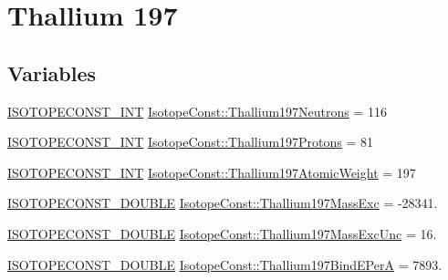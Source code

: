 \hypertarget{group___isotope_const-_thallium-_tl197}{}\section{Thallium 197}
\label{group___isotope_const-_thallium-_tl197}
\subsection*{Variables}
\begin{DoxyCompactItemize}
\item 
\mbox{\hyperlink{group___isotope_const-_macros_ga5f18360b3e99483a35c32d789e62621c}{I\+S\+O\+T\+O\+P\+E\+C\+O\+N\+S\+T\+\_\+\+I\+NT}} \mbox{\hyperlink{group___isotope_const-_thallium-_tl197_ga1d223f5d027e66e6d9dc82ab54781329}{Isotope\+Const\+::\+Thallium197\+Neutrons}} = 116
\item 
\mbox{\hyperlink{group___isotope_const-_macros_ga5f18360b3e99483a35c32d789e62621c}{I\+S\+O\+T\+O\+P\+E\+C\+O\+N\+S\+T\+\_\+\+I\+NT}} \mbox{\hyperlink{group___isotope_const-_thallium-_tl197_gacc697cdf6e3c2a5d7f49e83fddb185a8}{Isotope\+Const\+::\+Thallium197\+Protons}} = 81
\item 
\mbox{\hyperlink{group___isotope_const-_macros_ga5f18360b3e99483a35c32d789e62621c}{I\+S\+O\+T\+O\+P\+E\+C\+O\+N\+S\+T\+\_\+\+I\+NT}} \mbox{\hyperlink{group___isotope_const-_thallium-_tl197_ga939c7b7c75b3d274691f4d997e8701d2}{Isotope\+Const\+::\+Thallium197\+Atomic\+Weight}} = 197
\item 
\mbox{\hyperlink{group___isotope_const-_macros_ga8f45a7272ce02c0b4c65c44636ed719a}{I\+S\+O\+T\+O\+P\+E\+C\+O\+N\+S\+T\+\_\+\+D\+O\+U\+B\+LE}} \mbox{\hyperlink{group___isotope_const-_thallium-_tl197_ga4ce213221b7a7850da5516ad109455b4}{Isotope\+Const\+::\+Thallium197\+Mass\+Exc}} = -\/28341.
\item 
\mbox{\hyperlink{group___isotope_const-_macros_ga8f45a7272ce02c0b4c65c44636ed719a}{I\+S\+O\+T\+O\+P\+E\+C\+O\+N\+S\+T\+\_\+\+D\+O\+U\+B\+LE}} \mbox{\hyperlink{group___isotope_const-_thallium-_tl197_gae0f626bf8d59512c9069a0d0c94f8102}{Isotope\+Const\+::\+Thallium197\+Mass\+Exc\+Unc}} = 16.
\item 
\mbox{\hyperlink{group___isotope_const-_macros_ga8f45a7272ce02c0b4c65c44636ed719a}{I\+S\+O\+T\+O\+P\+E\+C\+O\+N\+S\+T\+\_\+\+D\+O\+U\+B\+LE}} \mbox{\hyperlink{group___isotope_const-_thallium-_tl197_ga09b0a9d47d04fae1585e96feb121e330}{Isotope\+Const\+::\+Thallium197\+Bind\+E\+PerA}} = 7893.
\item 

\end{DoxyCompactItemize}
